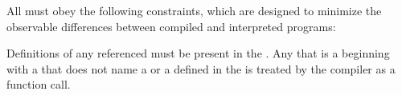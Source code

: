 \endlist
 
\endsubsubsection%


% 
%
% 

All  must obey the following constraints,
which are designed to minimize the observable differences 
between compiled and interpreted programs:

\beginlist
 \itemitem{\bull} Definitions of any referenced 
must be present in the .  
Any  that is a 
beginning with a  that does not name a
 or a  defined in the 
 is treated by the compiler as a 
function call.

